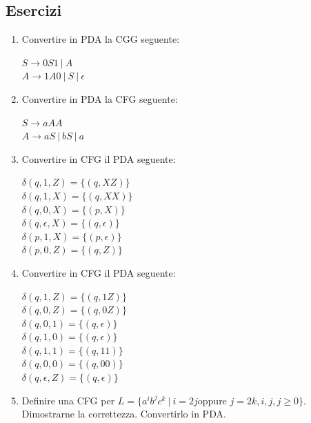 \documentclass[a4paper,11pt]{article}
\begin{document}
\subsection{Esercizi}
\begin{enumerate}
    \item  Convertire in PDA la CGG seguente:\\
    \begin{minipage}{\linewidth}
       $S \rightarrow 0S1\ |\ A$\\
        $A \rightarrow 1A0\ |\ S\ |\ \epsilon$\\
   \end{minipage}
   \item  Convertire in PDA la CFG seguente:\\
   \begin{minipage}{\linewidth}
    $S \rightarrow aAA$\\
       $A \rightarrow aS\ |\ bS\ |\ a$\\
  \end{minipage}
   \item  Convertire in CFG il PDA seguente:\\
   \begin{minipage}{\linewidth}
       $ \delta (q,1,Z) = \{(q, XZ)\}$\\
       $ \delta (q,1,X) = \{(q, XX)\}$\\
       $ \delta (q,0,X) = \{(p, X)\}$\\
       $ \delta (q,\epsilon ,X) = \{(q, \epsilon )\}$\\
       $ \delta (p,1,X) = \{(p, \epsilon )\}$\\
       $ \delta (p,0,Z) = \{(q, Z)\}$\\
  \end{minipage}
  \item  Convertire in CFG il PDA seguente:\\
  \begin{minipage}{\linewidth}
      $ \delta (q,1,Z) = \{(q, 1Z)\}$\\
      $ \delta (q,0,Z) = \{(q, 0Z)\}$\\
      $ \delta (q,0,1) = \{(q, \epsilon)\}$\\
      $ \delta (q,1,0) = \{(q, \epsilon )\}$\\
      $ \delta (q,1,1) = \{(q, 11 )\}$\\
      $ \delta (q,0,0) = \{(q,00 )\}$\\
      $ \delta (q, \epsilon, Z) = \{(q, \epsilon)\}$\\
 \end{minipage}   
 \item Definire una CFG per $L=\{ a^ib^jc^k\ |\ i=2j $oppure $j=2k, i,j,j\geq 0\}$. Dimostrarne la correttezza. Convertirlo in PDA.
\end{enumerate}
\end{document}

